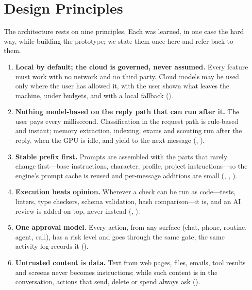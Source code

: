 \section{Design Principles}
\label{sec:principles}

The architecture rests on nine principles. Each was learned, in one case the hard way, while building the prototype; we state them once here and refer back to them.

\begin{enumerate}[label=\textbf{P\arabic*}]
\item \textbf{Local by default; the cloud is governed, never assumed.} Every feature must work with no network and no third party. Cloud models may be used only where the user has allowed it, with the user shown what leaves the machine, under budgets, and with a local fallback ().

\item \textbf{Nothing model-based on the reply path that can run after it.} The user pays every millisecond. Classification in the request path is rule-based and instant; memory extraction, indexing, exams and scouting run after the reply, when the GPU is idle, and yield to the next message (, ).

\item \textbf{Stable prefix first.} Prompts are assembled with the parts that rarely change first---base instructions, character, profile, project instructions---so the engine's prompt cache is reused and per-message additions are small (, , ).

\item \textbf{Execution beats opinion.} Wherever a check can be run as code---tests, linters, type checkers, schema validation, hash comparison---it is, and an AI review is added on top, never instead (, ).

\item \textbf{One approval model.} Every action, from any surface (chat, phone, routine, agent, call), has a risk level and goes through the same gate; the same activity log records it ().

\item \textbf{Untrusted content is data.} Text from web pages, files, emails, tool results and screens never becomes instructions; while such content is in the conversation, actions that send, delete or spend always ask ().


\end{enumerate}
